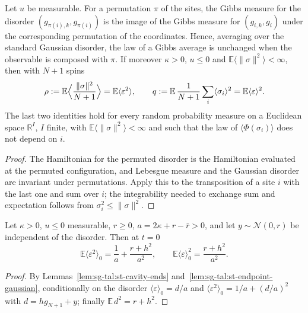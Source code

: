\begin{lemma}\label{lem:sg-tal:st-site-symmetry}
  \leanok
Let $u$ be measurable. For a permutation $\pi$ of the sites, the Gibbs measure for the disorder
$(g_{\pi(i),k},g_{\pi(i)})$ is the image of the Gibbs measure for $(g_{i,k},g_i)$ under the corresponding
permutation of the coordinates. Hence, averaging over the standard Gaussian disorder, the law of a Gibbs
average is unchanged when the observable is composed with $\pi$. If moreover $\kappa>0$, $u\le0$ and
$\mathbb E\langle\|\sigma\|^2\rangle<\infty$, then with $N+1$ spins
\[
\rho:=\mathbb E\Bigl\langle\frac{\|\sigma\|^2}{N+1}\Bigr\rangle=\mathbb E\langle\varepsilon^2\rangle,\qquad
q:=\mathbb E\,\frac1{N+1}\sum_i\langle\sigma_i\rangle^2=\mathbb E\langle\varepsilon\rangle^2 .
\]
The last two identities hold for every random probability measure on a Euclidean space $\mathbb R^{I}$, $I$
finite, with $\mathbb E\langle\|\sigma\|^2\rangle<\infty$ and such that the law of $\langle\Phi(\sigma_i)\rangle$ does not
depend on $i$.
\end{lemma}
\begin{proof}
  \leanok
The Hamiltonian for the permuted disorder is the Hamiltonian evaluated at the permuted configuration, and
Lebesgue measure and the Gaussian disorder are invariant under permutations. Apply this to the transposition of
a site $i$ with the last one and sum over $i$; the integrability needed to exchange sum and expectation
follows from $\sigma_i^2\le\|\sigma\|^2$.
\end{proof}

\begin{theorem}\label{thm:sg-tal:st-endpoint}
  \leanok
Let $\kappa>0$, $u\le0$ measurable, $r\ge0$, $a=2\kappa+r-\bar r>0$, and let $y\sim\mathcal N(0,r)$ be
independent of the disorder. Then at $t=0$
\[
\mathbb E\langle\varepsilon^2\rangle_0=\frac1a+\frac{r+h^2}{a^2},\qquad
\mathbb E\langle\varepsilon\rangle_0^2=\frac{r+h^2}{a^2}.
\]
\end{theorem}
\begin{proof}
  \leanok
By Lemmas~\ref{lem:sg-tal:st-cavity-ends} and~\ref{lem:sg-tal:st-endpoint-gaussian}, conditionally on the
disorder $\langle\varepsilon\rangle_0=d/a$ and $\langle\varepsilon^2\rangle_0=1/a+(d/a)^2$ with
$d=hg_{N+1}+y$; finally $\mathbb E\,d^2=r+h^2$.
\end{proof}


